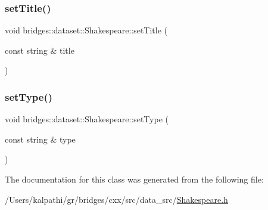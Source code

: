 \subsubsection{\texorpdfstring{setTitle()}{setTitle()}}
{\footnotesize\ttfamily void bridges\+::dataset\+::\+Shakespeare\+::set\+Title (\begin{DoxyParamCaption}\item[{const string \&}]{title }\end{DoxyParamCaption})\hspace{0.3cm}{\ttfamily [inline]}}

\mbox{\label{classbridges_1_1dataset_1_1_shakespeare_a4e9d1126524d2b10f5fe36ffd4588f15}} 
\subsubsection{\texorpdfstring{setType()}{setType()}}
{\footnotesize\ttfamily void bridges\+::dataset\+::\+Shakespeare\+::set\+Type (\begin{DoxyParamCaption}\item[{const string \&}]{type }\end{DoxyParamCaption})\hspace{0.3cm}{\ttfamily [inline]}}



The documentation for this class was generated from the following file\+:\begin{DoxyCompactItemize}
\item 
/\+Users/kalpathi/gr/bridges/cxx/src/data\+\_\+src/\mbox{\hyperlink{_shakespeare_8h}{Shakespeare.\+h}}\end{DoxyCompactItemize}
